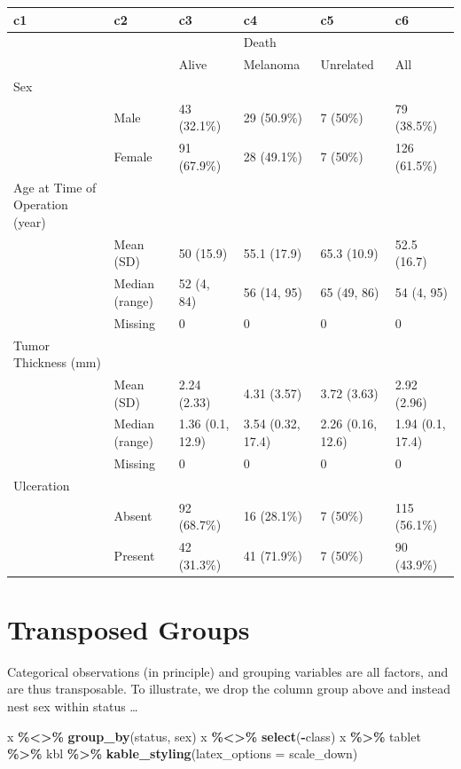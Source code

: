 \documentclass[
]{article}
\newenvironment{Shaded}{\begin{snugshade}}{\end{snugshade}}
\newcommand{\AttributeTok}[1]{\textcolor[rgb]{0.13,0.29,0.53}{#1}}
\newcommand{\FunctionTok}[1]{\textcolor[rgb]{0.13,0.29,0.53}{\textbf{#1}}}
\newcommand{\NormalTok}[1]{#1}
\newcommand{\SpecialCharTok}[1]{\textcolor[rgb]{0.81,0.36,0.00}{\textbf{#1}}}
\newcommand{\StringTok}[1]{\textcolor[rgb]{0.31,0.60,0.02}{#1}}
\begin{document}
\begin{tabular}[t]{l|l|l|l|l|l}
\hline
c1 & c2 & c3 & c4 & c5 & c6\\
\hline
 &  &  & Death &  & \\
\hline
 &  & Alive & Melanoma & Unrelated & All\\
\hline
Sex &  &  &  &  & \\
\hline
 & Male & 43 (32.1\%) & 29 (50.9\%) & 7 (50\%) & 79 (38.5\%)\\
\hline
 & Female & 91 (67.9\%) & 28 (49.1\%) & 7 (50\%) & 126 (61.5\%)\\
\hline
Age at Time of Operation (year) &  &  &  &  & \\
\hline
 & Mean (SD) & 50 (15.9) & 55.1 (17.9) & 65.3 (10.9) & 52.5 (16.7)\\
\hline
 & Median (range) & 52 (4, 84) & 56 (14, 95) & 65 (49, 86) & 54 (4, 95)\\
\hline
 & Missing & 0 & 0 & 0 & 0\\
\hline
Tumor Thickness (mm) &  &  &  &  & \\
\hline
 & Mean (SD) & 2.24 (2.33) & 4.31 (3.57) & 3.72 (3.63) & 2.92 (2.96)\\
\hline
 & Median (range) & 1.36 (0.1, 12.9) & 3.54 (0.32, 17.4) & 2.26 (0.16, 12.6) & 1.94 (0.1, 17.4)\\
\hline
 & Missing & 0 & 0 & 0 & 0\\
\hline
Ulceration &  &  &  &  & \\
\hline
 & Absent & 92 (68.7\%) & 16 (28.1\%) & 7 (50\%) & 115 (56.1\%)\\
\hline
 & Present & 42 (31.3\%) & 41 (71.9\%) & 7 (50\%) & 90 (43.9\%)\\
\hline
\end{tabular}

\section{Transposed Groups}\label{transposed-groups}

Categorical observations (in principle) and grouping variables are all
factors, and are thus transposable. To illustrate, we drop the column
group above and instead nest sex within status \ldots{}

\begin{Shaded}
\begin{Highlighting}[]
\NormalTok{x }\SpecialCharTok{\%\textless{}\textgreater{}\%} \FunctionTok{group\_by}\NormalTok{(status, sex)}
\NormalTok{x }\SpecialCharTok{\%\textless{}\textgreater{}\%} \FunctionTok{select}\NormalTok{(}\SpecialCharTok{{-}}\NormalTok{class)}
\NormalTok{x }\SpecialCharTok{\%\textgreater{}\%} 
\NormalTok{  tablet }\SpecialCharTok{\%\textgreater{}\%} 
\NormalTok{  kbl }\SpecialCharTok{\%\textgreater{}\%} 
  \FunctionTok{kable\_styling}\NormalTok{(}\AttributeTok{latex\_options =} \StringTok{\textquotesingle{}scale\_down\textquotesingle{}}\NormalTok{)}
\end{Highlighting}
\end{Shaded}
\end{document}
